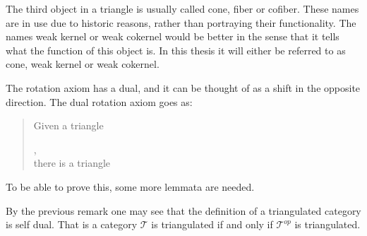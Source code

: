     \begin{remark}
        The third object in a triangle is usually called cone, fiber or cofiber. These names are in use due to historic reasons, rather than portraying their functionality. The names weak kernel or weak cokernel would be better in the sense that it tells what the function of this object is. In this thesis it will either be referred to as cone, weak kernel or weak cokernel.
    \end{remark}
    \begin{remark}
        The rotation axiom has a dual, and it can be thought of as a shift in the opposite direction. The dual rotation axiom goes as:
        
        \begin{quote}
            Given a triangle ,\\
            there is a triangle 
        \end{quote} %
        
        To be able to prove this, some more lemmata are needed.
    \end{remark}

    \begin{remark}
        By the previous remark one may see that the definition of a triangulated category is self dual. That is a category $\mathcal{T}$ is triangulated if and only if $\mathcal{T}^{op}$ is triangulated.
    \end{remark}

